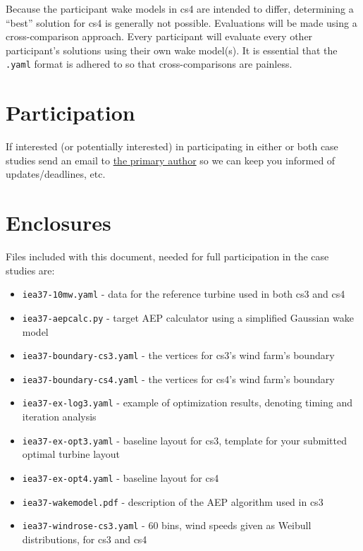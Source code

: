 \documentclass[10pt]{article}
\begin{document}
        Because the participant wake models in cs4 are intended to differ, determining a ``best'' solution for cs4 is generally not possible.
        Evaluations will be made using a cross-comparison approach.
        Every participant will evaluate every other participant's solutions using their own wake model(s).
        It is essential that the \texttt{.yaml} format is adhered to so that cross-comparisons are painless.

\section{Participation}

    If interested (or potentially interested) in participating in either or both case studies send an email to \href{mailto:Nicholas.F.Baker@byu.edu}{the primary author} so we can keep you informed of updates/deadlines, etc.

\section{Enclosures}
    Files included with this document, needed for full participation in the case studies are:

    \begin{itemize}[noitemsep,topsep=0pt,parsep=0pt,partopsep=0pt]
        \item \texttt{iea37-10mw.yaml} - data for the reference turbine used in both cs3 and cs4
        \item \texttt{iea37-aepcalc.py} - target AEP calculator using a simplified Gaussian wake model
        \item \texttt{iea37-boundary-cs3.yaml} - the vertices for cs3's wind farm's boundary
        \item \texttt{iea37-boundary-cs4.yaml} - the vertices for cs4's wind farm's boundary
        \item \texttt{iea37-ex-log3.yaml} - example of optimization results, denoting timing and iteration analysis
        \item \texttt{iea37-ex-opt3.yaml} - baseline layout for cs3, template for your submitted optimal turbine layout
        \item \texttt{iea37-ex-opt4.yaml} - baseline layout for cs4
        \item \texttt{iea37-wakemodel.pdf} - description of the AEP algorithm used in cs3
        \item \texttt{iea37-windrose-cs3.yaml} - 60 bins, wind speeds given as Weibull distributions, for cs3 and cs4
    \end{itemize}



\end{document}
